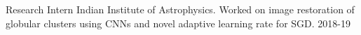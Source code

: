 
\begin{cvhonors}
    \cvhonor
        {Research Intern}
        {Indian Institute of Astrophysics. Worked on image restoration of globular clusters using CNNs and novel adaptive learning rate for SGD.}
        {}
        {2018-19}
\end{cvhonors}